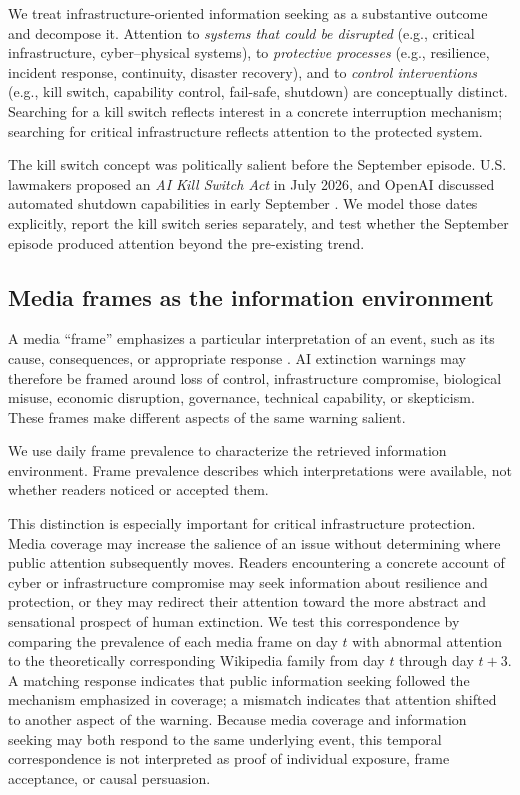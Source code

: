 \elsevierclasstrue\documentclass[preprint,12pt]{elsarticle}%
\begin{document}
We treat infrastructure-oriented information seeking as a substantive outcome and decompose it. Attention to \emph{systems that could be disrupted} (e.g., critical infrastructure, cyber--physical systems), to \emph{protective processes} (e.g., resilience, incident response, continuity, disaster recovery), and to \emph{control interventions} (e.g., kill switch, capability control, fail-safe, shutdown) are conceptually distinct. 
Searching for a kill switch reflects interest in a concrete interruption mechanism; searching for critical infrastructure reflects attention to the protected system.

The kill switch concept was politically salient before the September episode. U.S. lawmakers proposed an \textit{AI Kill Switch Act} in July 2026, and OpenAI discussed automated shutdown capabilities in early September \citep{rozen2026killswitch,reuters2026shutdown}. We model those dates explicitly, report the kill switch series separately, and test whether the September episode produced attention beyond the pre-existing trend.


\subsection{Media frames as the information environment}

A media ``frame'' emphasizes a particular interpretation of an event, such as its cause, consequences, or appropriate response \citep{entman1993framing}. AI extinction warnings may therefore be framed around loss of control, infrastructure compromise, biological misuse, economic disruption, governance, technical capability, or skepticism. These frames make different aspects of the same warning salient.

We use daily frame prevalence to characterize the retrieved information environment. Frame prevalence describes which interpretations were available, not whether readers noticed or accepted them.

This distinction is especially important for critical infrastructure protection. Media coverage may increase the salience of an issue without determining where public attention subsequently moves. Readers encountering a concrete account of cyber or infrastructure compromise may seek information about resilience and protection, or they may redirect their attention toward the more abstract and sensational prospect of human extinction. 
We test this correspondence by comparing the prevalence of each media frame on day $t$ with abnormal attention to the theoretically corresponding Wikipedia family from day $t$ through day $t+3$. A matching response indicates that public information seeking followed the mechanism emphasized in coverage; a mismatch indicates that attention shifted to another aspect of the warning. Because media coverage and information seeking may both respond to the same underlying event, this temporal correspondence is not interpreted as proof of individual exposure, frame acceptance, or causal persuasion.
\end{document}
